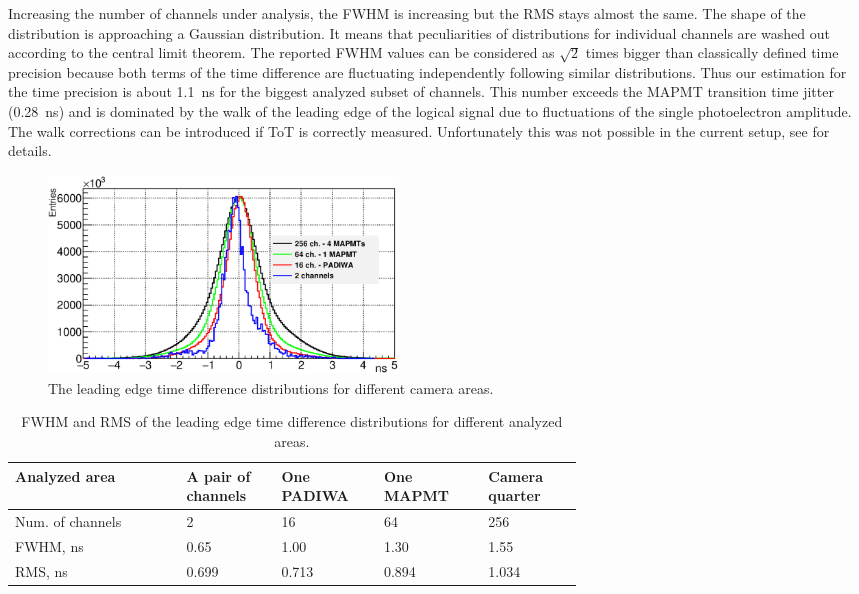 \documentclass[final,5p,times,twocolumn]{elsarticle}
\begin{document}
Increasing the number of channels under analysis, the FWHM is increasing but the RMS stays almost the same. The shape of the distribution is approaching a Gaussian distribution. It means that peculiarities of distributions for individual channels are washed out according to the central limit theorem. The reported FWHM values can be considered as $ \sqrt 2 $ times bigger than classically defined time precision because both terms of the time difference are fluctuating independently following similar distributions. Thus our estimation for the time precision is about 1.1~ns for the biggest analyzed subset of channels. This number exceeds the MAPMT transition time jitter (0.28~ns) and is dominated by the walk of the leading edge of the logical signal due to fluctuations of the single photoelectron amplitude. The walk corrections can be introduced if ToT is correctly measured. Unfortunately this was not possible in the current setup, see \cite{PEPAN} for details.

\begin{figure}[tbh]
	\centering
	\includegraphics[width=0.45\textwidth]{figures/TimePrecision_evolution_laser_WLSoff_color.eps}
	\caption{The leading edge time difference distributions for different camera areas.}
	\label{fig:TimePrec}
\end{figure}

\begin{table}[tbh]
\centering
	\begin{tabular}{ | p{0.22\linewidth} | p{0.10\linewidth} | p{0.10\linewidth} | p{0.12\linewidth} | p{0.12\linewidth} | }
		\hline		
		\scriptsize{Analyzed area} & \scriptsize{A pair of channels} & \scriptsize{One PADIWA} & \scriptsize{One MAPMT} & \scriptsize{Camera quarter} \\
		\hline
		\scriptsize{Num. of channels} & 2 & 16 & 64 & 256\\
		\hline
		\scriptsize{FWHM, ns} & 0.65 & 1.00 & 1.30 & 1.55\\
		\hline
		\scriptsize{RMS, ns} & 0.699 & 0.713 & 0.894 & 1.034\\
		\hline
	\end{tabular}

	\caption{FWHM and RMS of the leading edge time difference distributions for different analyzed areas.}
	\label{tabl:TimePrecTable}

\end{table}
\end{document}
